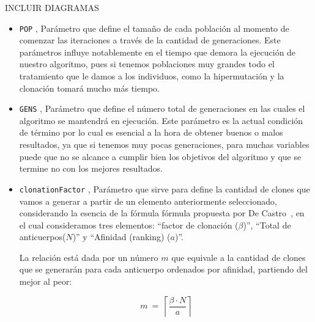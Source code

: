 %

 INCLUIR DIAGRAMAS

\begin{itemize}
	\item \texttt{POP} , Parámetro que define el tamaño de cada población al momento de comenzar
			las iteraciones a través de la cantidad de generaciones.
			Este parámetros influye notablemente en el tiempo que demora la ejecución de nuestro algoritmo,
			pues si tenemos poblaciones muy grandes todo el tratamiento que le damos a los individuos,
			como la hipermutación y la clonación tomará mucho más tiempo.

	\item \texttt{GENS} , Parámetro que define el número total de generaciones en las cuales
			el algoritmo se mantendrá en ejecución. Este parámetro es la actual condición de término
			por lo cual es esencial a la hora de obtener buenos o malos resultados, ya que si tenemos
			muy pocas generaciones, para muchas variables puede que no se alcance a cumplir bien los
			objetivos del algoritmo y que se termine no con los mejores resultados.

	\item \texttt{clonationFactor} \blue{[0,1]} \red{$(\beta)$}, Parámetro que sirve para define la cantidad de clones
			que vamos a generar a partir de un elemento anteriormente seleccionado, considerando la esencia de la
			fórmula fórmula propuesta por De Castro~\cite{decastro}, en el cual consideramos tres elementos:
			``factor de clonación ($\beta$)'', ``Total de anticuerpos($N$)'' y ``Afinidad (ranking) ($a$)''.
			
			La relación está dada por un número $m$ que equivale a la cantidad de clones que se generarán
            para cada anticuerpo ordenados por afinidad, partiendo del mejor al peor:

            $$m\ =\ \left\lceil\frac{\beta \cdot N}{a}\right\rceil$$


\end{itemize}
